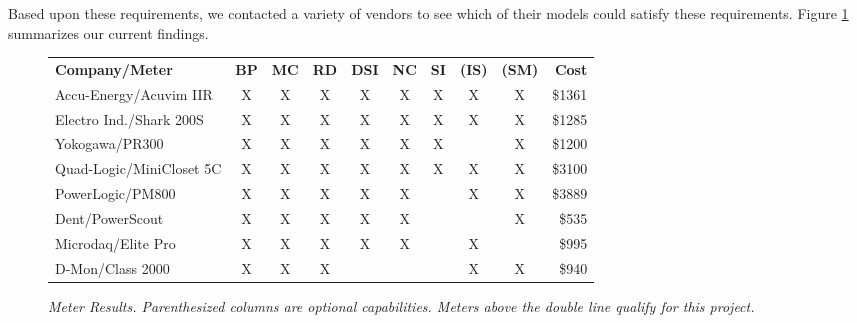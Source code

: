 \documentclass[11pt]{article}
\begin{document}
Based upon these requirements, we contacted a variety of vendors to see
which of their models could satisfy these requirements.  Figure
\ref{fig:meterresults} summarizes our current findings.  

\begin{figure}[!ht]
\small
\begin{tabular}{lccccccccr} \hline
{\bf Company/Meter }          & {\bf BP } & {\bf MC} & {\bf RD} & {\bf DSI} & {\bf NC} & {\bf SI} & {\bf (IS)} & {\bf (SM)} & {\bf Cost}   \\ 
Accu-Energy/Acuvim IIR       &   X           &           X    &           X   &          X    &          X     &         X   &          X    &         X   &        \$1361 \\ 
Electro Ind./Shark 200S        &      X        &           X    &           X   &          X    &          X     &         X   &          X    &         X   &        \$1285 \\ 
Yokogawa/PR300                  &      X        &           X    &           X   &          X    &          X     &         X   &                &         X     &          \$1200 \\  
Quad-Logic/MiniCloset 5C   &   X           &           X    &           X   &          X    &          X     &        X    &          X    &         X   &         \$3100 \\   \hline \hline
PowerLogic/PM800                &      X        &           X    &           X   &          X    &          X     &              &          X    &          X  &          \$3889 \\  
Dent/PowerScout                   &      X        &           X    &           X   &          X    &          X     &              &                &           X   &          \$535 \\  
Microdaq/Elite Pro                 &      X        &           X    &           X   &          X    &          X     &              &          X      &              &          \$995 \\  
D-Mon/Class 2000                 &      X       &           X    &           X   &                &                 &               &          X    &          X    &          \$940 \\  \hline
\end{tabular} 
\normalsize
\caption{{\em Meter Results. Parenthesized columns are optional capabilities. Meters above the double line qualify for this project. }}
\label{fig:meterresults}
\end{figure}
\end{document}
